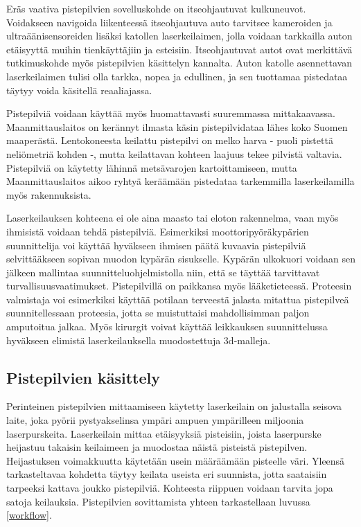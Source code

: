 Eräs vaativa pistepilvien sovelluskohde on itseohjautuvat kulkuneuvot. Voidakseen navigoida liikenteessä itseohjautuva auto tarvitsee kameroiden ja ultraäänisensoreiden lisäksi katollen laserkeilaimen, jolla voidaan tarkkailla auton etäisyyttä muihin tienkäyttäjiin ja esteisiin. Itseohjautuvat autot ovat merkittävä tutkimuskohde myös pistepilvien käsittelyn kannalta. Auton katolle asennettavan laserkeilaimen tulisi olla tarkka, nopea ja edullinen, ja sen tuottamaa pistedataa täytyy voida käsitellä reaaliajassa. \cite{car} 

Pistepilviä voidaan käyttää myös huomattavasti suuremmassa mittakaavassa. Maanmittauslaitos on kerännyt ilmasta käsin pistepilvidataa lähes koko Suomen maaperästä. Lentokoneesta keilattu pistepilvi on melko harva - puoli pistettä neliömetriä kohden -, mutta keilattavan kohteen laajuus tekee pilvistä valtavia. Pistepilviä on käytetty lähinnä metsävarojen kartoittamiseen, mutta Maanmittauslaitos aikoo ryhtyä keräämään pistedataa tarkemmilla laserkeilamilla myös rakennuksista. \cite{hs}

Laserkeilauksen kohteena ei ole aina maasto tai eloton rakennelma, vaan myös ihmisistä voidaan tehdä pistepilviä. Esimerkiksi moottoripyöräkypärien suunnittelija voi käyttää hyväkseen ihmisen päätä kuvaavia pistepilviä selvittääkseen sopivan muodon kypärän sisukselle. Kypärän ulkokuori voidaan sen jälkeen mallintaa suunnitteluohjelmistolla niin, että se täyttää tarvittavat turvallisuusvaatimukset. Pistepilvillä on paikkansa myös lääketieteessä. Proteesin valmistaja voi esimerkiksi käyttää potilaan terveestä jalasta mitattua pistepilveä suunnitellessaan proteesia, jotta se muistuttaisi mahdollisimman paljon amputoitua jalkaa. Myös kirurgit voivat käyttää leikkauksen suunnittelussa hyväkseen elimistä laserkeilauksella muodostettuja 3d-malleja. \cite{saxena}  

\subsection{Pistepilvien käsittely}

Perinteinen pistepilvien mittaamiseen käytetty laserkeilain on jalustalla seisova laite, joka pyörii pystyakselinsa ympäri ampuen ympärilleen miljoonia laserpurskeita. Laserkeilain mittaa etäisyyksiä pisteisiin, joista laserpurske heijastuu takaisin keilaimeen ja muodostaa näistä pisteistä pistepilven. Heijastuksen voimakkuutta käytetään usein määräämään pisteelle väri. Yleensä tarkasteltavaa kohdetta täytyy keilata useista eri suunnista, jotta saataisiin tarpeeksi kattava joukko pistepilviä. Kohteesta riippuen voidaan tarvita jopa satoja keilauksia. Pistepilvien sovittamista yhteen tarkastellaan luvussa \ref{workflow}.

